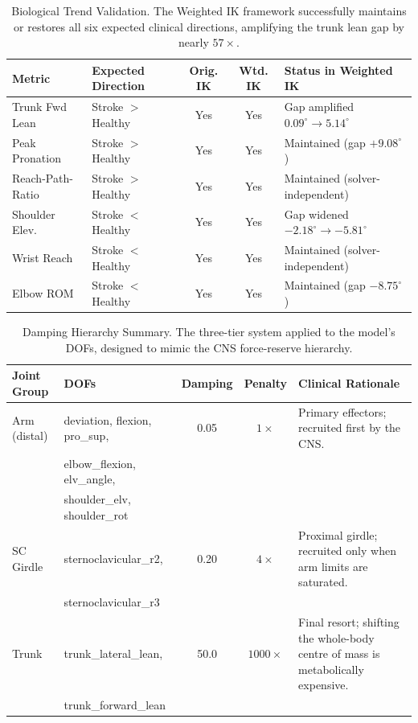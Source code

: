 \documentclass[12pt, a4paper]{article}
\begin{document}
\clearpage
\begin{table}[h]
  \centering
  \caption{Biological Trend Validation. The Weighted IK framework successfully maintains or restores all six expected clinical directions, amplifying the trunk lean gap by nearly $57\times$.}
  \vspace{0.5em}
  \begin{tabular}{llccp{5cm}}
    \toprule
    \textbf{Metric} & \textbf{Expected Direction} & \textbf{Orig. IK} & \textbf{Wtd. IK} & \textbf{Status in Weighted IK} \\
    \midrule
    Trunk Fwd Lean & Stroke $>$ Healthy & Yes & Yes & Gap amplified $0.09^{\circ} \rightarrow 5.14^{\circ}$ \\
    Peak Pronation & Stroke $>$ Healthy & Yes & Yes & Maintained (gap $+9.08^{\circ}$) \\
    Reach-Path-Ratio & Stroke $>$ Healthy & Yes & Yes & Maintained (solver-independent) \\
    Shoulder Elev. & Stroke $<$ Healthy & Yes & Yes & Gap widened $-2.18^{\circ} \rightarrow -5.81^{\circ}$ \\
    Wrist Reach & Stroke $<$ Healthy & Yes & Yes & Maintained (solver-independent) \\
    Elbow ROM & Stroke $<$ Healthy & Yes & Yes & Maintained (gap $-8.75^{\circ}$) \\
    \bottomrule
  \end{tabular}
\end{table}

\clearpage
\begin{table}[h]
  \centering
  \caption{Damping Hierarchy Summary. The three-tier system applied to the model's DOFs, designed to mimic the CNS force-reserve hierarchy.}
  \vspace{0.5em}
  \begin{tabular}{llccp{4.5cm}}
    \toprule
    \textbf{Joint Group} & \textbf{DOFs} & \textbf{Damping} & \textbf{Penalty} & \textbf{Clinical Rationale} \\
    \midrule
    Arm (distal) & deviation, flexion, pro\_sup, & 0.05 & $1\times$ & Primary effectors; recruited first by the CNS. \\
                 & elbow\_flexion, elv\_angle,   &      &           & \\
                 & shoulder\_elv, shoulder\_rot  &      &           & \\
    \midrule
    SC Girdle & sternoclavicular\_r2,         & 0.20 & $4\times$ & Proximal girdle; recruited only when arm limits are saturated. \\
                 & sternoclavicular\_r3          &      &           & \\
    \midrule
    Trunk        & trunk\_lateral\_lean,         & 50.0 & $1000\times$ & Final resort; shifting the whole-body centre of mass is metabolically expensive. \\
                 & trunk\_forward\_lean          &      &           & \\
    \bottomrule
  \end{tabular}
\end{table}
\end{document}
